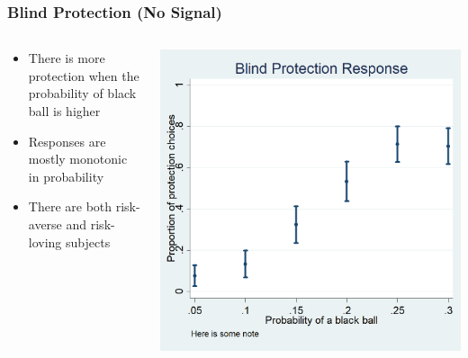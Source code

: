 \documentclass[11pt,hyperref={bookmarks=false}]{beamer}
\begin{document}
\begin{frame}
\frametitle{Blind Protection (No Signal)}
\begin{columns}
\begin{column}{0.5\textwidth}
\begin{itemize}
\item There is more protection when the probability of black ball is higher
\item Responses are mostly monotonic in probability
\item There are both risk-averse and risk-loving subjects
\end{itemize}
\end{column}

\begin{column}{0.5\textwidth}
\begin{center}
\includegraphics[width=\textwidth]{Graphs/blind_prot_sta.png}
\end{center}
\end{column}
\end{columns}
\end{frame}
\end{document}

